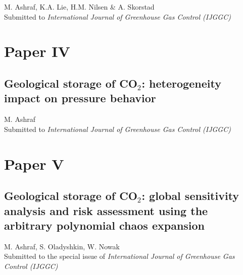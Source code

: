 \noindent M. Ashraf, K.A. Lie, H.M. Nilsen \& A.
Skorstad\\

\noindent Submitted to \textit{International Journal of Greenhouse Gas Control
(IJGGC)}
\cleardoublepage




\chapter*{Paper IV}
\section{Geological storage of CO$_2$: heterogeneity impact on pressure
behavior}

\noindent M. Ashraf\\

\noindent Submitted to \textit{International Journal of Greenhouse Gas Control
(IJGGC)}
\cleardoublepage



\chapter*{Paper V}
\section{Geological storage of CO$_2$: global sensitivity analysis
and risk assessment using the arbitrary polynomial
chaos expansion
}

\noindent M. Ashraf, S. Oladyshkin, W. Nowak\\

\noindent Submitted to the special issue of \textit{International Journal of
Greenhouse Gas Control (IJGGC)}
\cleardoublepage

